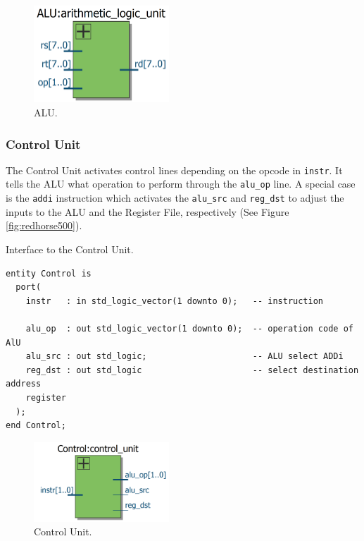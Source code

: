 \documentclass[a4paper, 11pt,oneside]{article}
\begin{document}
\begin{figure}[H]
	\begin{center}
	\includegraphics[width=2in]{alu.png}
	\caption{ALU.}
	\label{fig:alu} 
	\end{center}
\end{figure}

\subsubsection{Control Unit}
The Control Unit activates control lines depending on the opcode in 
\texttt{instr}. It tells the ALU what operation to perform through 
the \texttt{alu_op} line. A special case is 
the \texttt{addi} instruction which activates the 
\texttt{alu_src} and \texttt{reg_dst} to adjust the 
inputs to the ALU and the Register File, respectively (See Figure 
\ref{fig:redhorse500}). 


\begin{listing}[H]
\caption{Interface to the Control Unit.}
\label{code:control}
\begin{verbatim}
entity Control is
  port(
    instr   : in std_logic_vector(1 downto 0);   -- instruction

    alu_op  : out std_logic_vector(1 downto 0);  -- operation code of AlU
    alu_src : out std_logic;                     -- ALU select ADDi
    reg_dst : out std_logic                      -- select destination address 
    register
  );
end Control;
\end{verbatim}
\end{listing}

\begin{figure}[H]
	\begin{center}
	\includegraphics[width=2in]{control_unit.png}
	\caption{Control Unit.}
	\label{fig:cu} 
	\end{center}
\end{figure}
\end{document}
